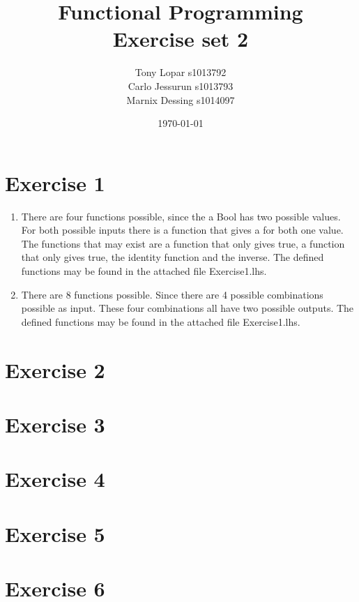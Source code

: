 \documentclass{article}
\begin{document}
\title{Functional Programming \\ Exercise set 2}
\date{\today}
\author{Tony Lopar s1013792 \\ Carlo Jessurun s1013793 \\ Marnix Dessing s1014097}
\maketitle

\section*{Exercise 1}
\begin{enumerate}
  \item There are four functions possible, since the a Bool has two possible values. For both possible inputs there is a function that gives a for both one value. The functions that may exist are a function that only gives true, a function that only gives true, the identity function and the inverse. The defined functions may be found in the attached file Exercise1.lhs.
  \item There are 8 functions possible. Since there are 4 possible combinations possible as input. These four combinations all have two possible outputs. The defined functions may be found in the attached file Exercise1.lhs.
\end{enumerate}

\section*{Exercise 2}


\section*{Exercise 3}


\section*{Exercise 4}


\section*{Exercise 5}


\section*{Exercise 6}
\end{document}

